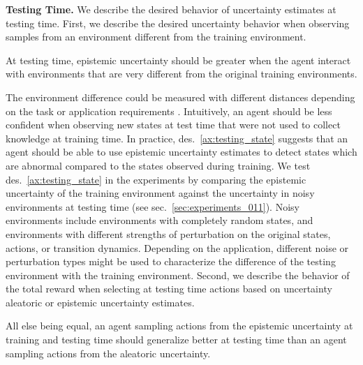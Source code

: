 \textbf{Testing Time.} We describe the desired behavior of uncertainty estimates at testing time. First, we describe the desired uncertainty behavior when observing samples from an environment different from the training environment.
\begin{desiderata}
    \label{ax:testing_state}
    At testing time, epistemic uncertainty should be greater when the agent interact with environments that are very different from the original training environments.
\end{desiderata}
\vspace{-2mm}
The environment difference could be measured with different distances depending on the task or application requirements \cite{domain-shifts-rl}. Intuitively, an agent should be less confident when observing new states at test time that were not used to collect knowledge at training time. In practice, des.~\ref{ax:testing_state} suggests that an agent should be able to use epistemic uncertainty estimates to detect states which are abnormal compared to the states observed during training. We test des.~\ref{ax:testing_state} in the experiments by comparing the epistemic uncertainty of the training environment against the uncertainty in noisy environments at testing time (see sec.~\ref{sec:experiments_011}). Noisy environments include environments with completely random states, and environments with different strengths of perturbation on the original states, actions, or transition dynamics. Depending on the application, different noise or perturbation types might be used to characterize the difference of the testing environment with the training environment. Second, we describe the behavior of the total reward when selecting at testing time actions based on uncertainty aleatoric or epistemic uncertainty estimates.
\begin{desiderata}
    \label{ax:testing_strategy}
    All else being equal, an agent sampling actions from the epistemic uncertainty at training and testing time should generalize better at testing time than an agent sampling actions from the aleatoric uncertainty.
\end{desiderata}
\vspace{-2mm}
